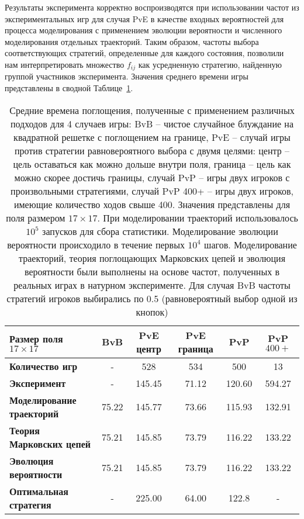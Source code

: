 Результаты эксперимента корректно воспроизводятся при использовании частот из экспериментальных игр для случая PvE в качестве входных вероятностей для процесса моделирования с применением эволюции вероятности и численного моделирования отдельных траекторий. Таким образом, частоты выбора соответствующих стратегий, определенные для каждого состояния, позволили нам интерпретировать множество $f_{ij}$ как усредненную стратегию, найденную группой участников эксперимента. Значения среднего времени игры представлены в сводной Таблице~\cref{tab:time}.

\begin{table}
    \fontsize{10pt}{10pt}\selectfont
    \begin{tabular}{|l|c|c|c|c|c|}
        \toprule
        Размер поля $17 \times 17$ & \textbf{BvB} & \textbf{PvE центр} & \textbf{PvE граница} & \textbf{PvP} & \textbf{PvP $400+$} \\ 
        \midrule
        \textbf{Количество игр} & -     & 528    & 534   & 500    & 13     \\
        \midrule
        \textbf{Эксперимент}  & -     & 145.45 & 71.12 & 120.60 & 594.27 \\ 
        \textbf{Моделирование траекторий}  & 75.22 & 145.77 & 73.66 & 115.93 & 132.91 \\
        \textbf{Теория Марковских цепей}  & 75.21 & 145.85 & 73.79 & 116.22 & 133.22 \\
        \textbf{Эволюция вероятности}   & 75.21 & 145.85 & 73.79 & 116.22 & 133.22 \\ 
        \textbf{Оптимальная стратегия}     & -     & 225.00 & 64.00 & 122.8  & -      \\ 
        \bottomrule
    \end{tabular}
    \caption{
        Средние времена поглощения, полученные с применением различных подходов для 4 случаев игры: BvB -- чистое случайное блуждание на квадратной решетке с поглощением на границе, PvE -- случай игры против стратегии равновероятного выбора с двумя целями: центр -- цель оставаться как можно дольше внутри поля, граница -- цель как можно скорее достичь границы, случай PvP -- игры двух игроков с произвольными стратегиями, случай PvP 400+ -- игры двух игроков, имеющие количество ходов свыше 400. Значения представлены для поля размером $17 \times 17$. При моделировании траекторий использовалось $10^5$ запусков для сбора статистики. Моделирование эволюции вероятности происходило в течение первых $10^4$ шагов. Моделирование траекторий, теория поглощающих Марковских цепей и эволюция вероятности были выполнены на основе частот, полученных в реальных играх в натурном эксперименте. Для случая BvB частоты стратегий игроков выбирались по 0.5 (равновероятный выбор одной из кнопок)
    }
    \label{tab:time}
\end{table}

